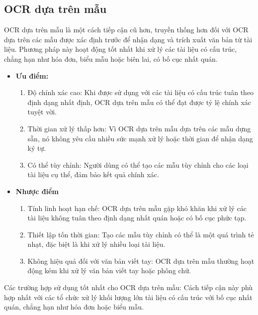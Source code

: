 \subsection{OCR dựa trên mẫu}
OCR dựa trên mẫu là một cách tiếp cận cũ hơn, truyền thống hơn đối với OCR dựa trên các mẫu được xác định trước để nhận dạng và trích xuất văn bản từ tài liệu. Phương pháp này hoạt động tốt nhất khi xử lý các tài liệu có cấu trúc, chẳng hạn như hóa đơn, biểu mẫu hoặc biên lai, có bố cục nhất quán. \cite{template-ai-ocr}
\begin{itemize}
    \item[] \textbf{Ưu điểm:} \begin{enumerate}
            \item Độ chính xác cao: Khi được sử dụng với các tài liệu có cấu trúc tuân theo định dạng nhất định, OCR dựa trên mẫu có thể đạt được tỷ lệ chính xác tuyệt vời.
            \item Thời gian xử lý thấp hơn: Vì OCR dựa trên mẫu dựa trên các mẫu dựng sẵn, nó không yêu cầu nhiều sức mạnh xử lý hoặc thời gian để nhận dạng ký tự.
            \item Có thể tùy chỉnh: Người dùng có thể tạo các mẫu tùy chỉnh cho các loại tài liệu cụ thể, đảm bảo kết quả chính xác.
        \end{enumerate}
    \item[] \textbf{Nhược điểm} \begin{enumerate}
            \item Tính linh hoạt hạn chế: OCR dựa trên mẫu gặp khó khăn khi xử lý các tài liệu không tuân theo định dạng nhất quán hoặc có bố cục phức tạp.
            \item Thiết lập tốn thời gian: Tạo các mẫu tùy chỉnh có thể là một quá trình tẻ nhạt, đặc biệt là khi xử lý nhiều loại tài liệu.
            \item Không hiệu quả đối với văn bản viết tay: OCR dựa trên mẫu thường hoạt động kém khi xử lý văn bản viết tay hoặc phông chữ.
        \end{enumerate}
\end{itemize}

Các trường hợp sử dụng tốt nhất cho OCR dựa trên mẫu: Cách tiếp cận này phù hợp nhất với các tổ chức xử lý khối lượng lớn tài liệu có cấu trúc với bố cục nhất quán, chẳng hạn như hóa đơn hoặc biểu mẫu.

